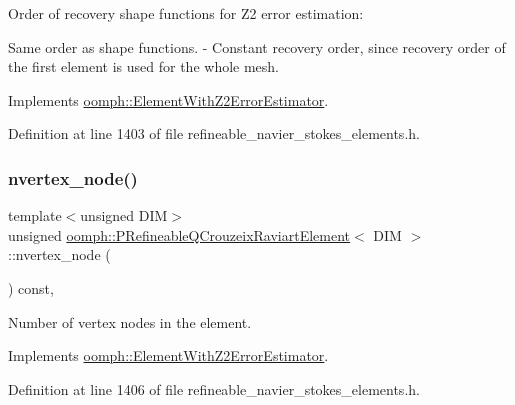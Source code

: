 Order of recovery shape functions for Z2 error estimation\+: 


\begin{DoxyItemize}
\item Same order as shape functions. -\/ Constant recovery order, since recovery order of the first element is used for the whole mesh. 
\end{DoxyItemize}

Implements \hyperlink{classoomph_1_1ElementWithZ2ErrorEstimator_af39480835bd3e0f6b2f4f7a9a4044798}{oomph\+::\+Element\+With\+Z2\+Error\+Estimator}.



Definition at line 1403 of file refineable\+\_\+navier\+\_\+stokes\+\_\+elements.\+h.

\mbox{\label{classoomph_1_1PRefineableQCrouzeixRaviartElement_a4f29431659c8fb00cd2b56b21bcb722c}} 
\subsubsection{\texorpdfstring{nvertex\+\_\+node()}{nvertex\_node()}}
{\footnotesize\ttfamily template$<$unsigned D\+IM$>$ \\
unsigned \hyperlink{classoomph_1_1PRefineableQCrouzeixRaviartElement}{oomph\+::\+P\+Refineable\+Q\+Crouzeix\+Raviart\+Element}$<$ D\+IM $>$\+::nvertex\+\_\+node (\begin{DoxyParamCaption}{ }\end{DoxyParamCaption}) const\hspace{0.3cm}{\ttfamily [inline]}, {\ttfamily [virtual]}}



Number of vertex nodes in the element. 



Implements \hyperlink{classoomph_1_1ElementWithZ2ErrorEstimator_a19495a0e77ef4ff35f15fdf7913b4077}{oomph\+::\+Element\+With\+Z2\+Error\+Estimator}.



Definition at line 1406 of file refineable\+\_\+navier\+\_\+stokes\+\_\+elements.\+h.



